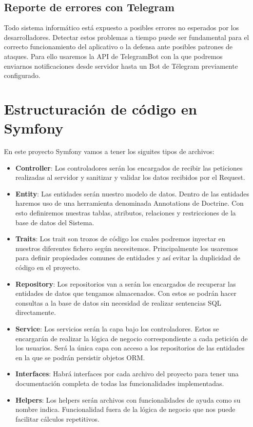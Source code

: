 \subsection{Reporte de errores con Telegram} 

Todo sistema informático está expuesto a posibles errores no esperados por los desarrolladores. Detectar estos problemas a tiempo puede ser fundamental para el correcto funcionamiento del aplicativo o la defensa ante posibles patrones de ataques.
Para ello usaremos la API de TelegramBot \cite{telegrambot} con la que podremos enviarnos notificaciones desde servidor hasta un Bot de Télegram previamente configurado.

\section{Estructuración de código en Symfony}

En este proyecto Symfony vamos a tener los siguites tipos de archivos:

\begin{itemize}
    \item \textbf{Controller}: Los controladores serán los encargados de recibir las peticiones realizadas al servidor y sanitizar y validar los datos recibidos por el Request.
    \item \textbf{Entity}: Las entidades serán nuestro modelo de datos. Dentro de las entidades haremos uso de una herramienta denominada Annotations de Doctrine. Con esto definiremos nuestras tablas, atributos, relaciones y restricciones de la base de datos del Sistema.
    \item \textbf{Traits}: Los trait son trozos de código los cuales podremos inyectar en nuestros diferentes fichero según necesitemos. Principalmente los usaremos para definir propiedades comunes de entidades y así evitar la duplicidad de código en el proyecto.
    \item \textbf{Repository}: Los repositorios van a serán los encargados de recuperar las entidades de datos que tengamos almacenados. Con estos se podrán hacer consultas a la base de datos sin necesidad de realizar sentencias SQL directamente.
    \item \textbf{Service}: Los servicios serán la capa bajo los controladores. Estos se encargarán de realizar la lógica de negocio correspondiente a cada petición de los usuarios. Será la única capa con acceso a los repositorios de las entidades en la que se podrán persistir objetos ORM.
    \item \textbf{Interfaces}: Habrá interfaces por cada archivo del proyecto para tener una documentación completa de todas las funcionalidades implementadas.
    \item \textbf{Helpers}: Los helpers serán archivos con funcionalidades de ayuda como su nombre indica. Funcionalidad fuera de la lógica de negocio que nos puede facilitar cálculos repetitivos.
\end{itemize}


